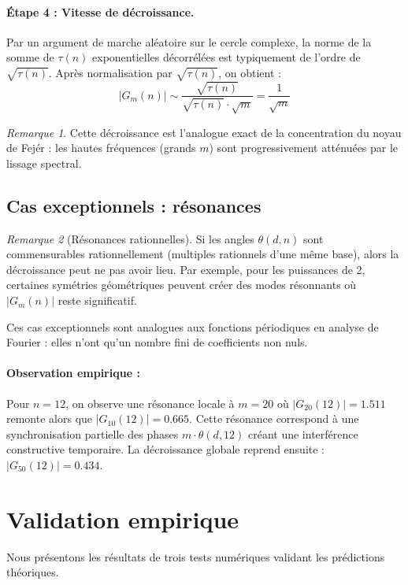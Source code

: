 \documentclass[12pt,a4paper]{article}
\theoremstyle{definition}
\theoremstyle{remark}
\newtheorem{remark}{Remarque}[section]
\newcommand{\Gm}[2]{G_{#1}(#2)}              %
\newcommand{\thetaG}[2]{\theta(#1,#2)}       %
\begin{document}
\paragraph{Étape 4 : Vitesse de décroissance.}
Par un argument de marche aléatoire sur le cercle complexe, la norme de la somme de $\tau(n)$ exponentielles décorrélées est typiquement de l'ordre de $\sqrt{\tau(n)}$. Après normalisation par $\sqrt{\tau(n)}$, on obtient :
\[
|\Gm{m}{n}| \sim \frac{\sqrt{\tau(n)}}{\sqrt{\tau(n)} \cdot \sqrt{m}} = \frac{1}{\sqrt{m}}
\]

\begin{remark}
Cette décroissance est l'analogue exact de la concentration du noyau de Fejér : les hautes fréquences (grands $m$) sont progressivement atténuées par le lissage spectral.
\end{remark}

\subsection{Cas exceptionnels : résonances}

\begin{remark}[Résonances rationnelles]
Si les angles $\thetaG{d}{n}$ sont commensurables rationnellement (multiples rationnels d'une même base), alors la décroissance peut ne pas avoir lieu. Par exemple, pour les puissances de 2, certaines symétries géométriques peuvent créer des modes résonnants où $|\Gm{m}{n}|$ reste significatif.

Ces cas exceptionnels sont analogues aux fonctions périodiques en analyse de Fourier : elles n'ont qu'un nombre fini de coefficients non nuls.

\paragraph{Observation empirique :} Pour $n=12$, on observe une résonance locale à $m=20$ où $|\Gm{20}{12}| = 1.511$ remonte alors que $|\Gm{10}{12}| = 0.665$. Cette résonance correspond à une synchronisation partielle des phases $m \cdot \thetaG{d}{12}$ créant une interférence constructive temporaire. La décroissance globale reprend ensuite : $|\Gm{50}{12}| = 0.434$.
\end{remark}

\section{Validation empirique}

Nous présentons les résultats de trois tests numériques validant les prédictions théoriques.
\end{document}
